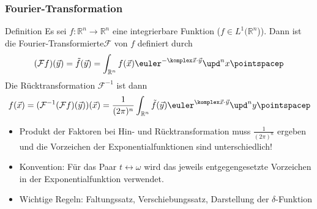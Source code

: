  \begin{frame}
  \frametitle{Fourier-Transformation}
  \begin{block}{Definition}
    Es sei \(f: \mathbb{R}^n \to \mathbb{R}^n\) eine integrierbare Funktion (\(f \in L^1(\mathbb{R}^n\))). Dann ist die \alert{Fourier-Transformierte}${\mathcal F}$ von \(f\) definiert durch
    \begin{equation*}
      ({\mathcal F}f)(\vec{y}) = \tilde{f}(\vec{y}) = \int_{\mathbb{R}^n} f(\vec{x}) \euler^{-\komplex \vec{x}\cdot\vec{y}} \upd^n x \pointspacep
    \end{equation*}
    Die \alert{Rücktransformation} ${\mathcal F}^{-1}$ ist dann
    \begin{equation*}
      f(\vec{x}) = ({\mathcal F}^{-1} ({\mathcal F}f)(\vec{y}))(\vec{x}) = \frac{1}{(2\pi)^n} \int_{\mathbb{R}^n} \tilde{f}(\vec{y}) \euler^{\komplex \vec{x}\cdot\vec{y}} \upd^n y \pointspacep
    \end{equation*}
    \end{block}
  \begin{itemize}[<+->]
    \item Produkt der Faktoren bei Hin- und Rücktransformation muss \(\frac{1}{(2\pi)^n} \) ergeben und die Vorzeichen der Exponentialfunktionen sind unterschiedlich!
    \item Konvention: Für das Paar \(t \leftrightarrow \omega\) wird das jeweils entgegengesetzte Vorzeichen in der Exponentialfunktion verwendet.
      \item Wichtige Regeln: \alert{Faltungssatz}, \alert{Verschiebungssatz}, \alert{Darstellung der \(\delta\)-Funktion}
    \end{itemize}
  \end{frame}
 

